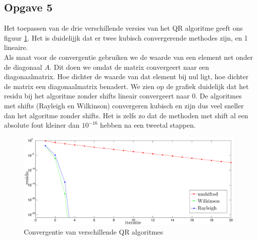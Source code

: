 \documentclass[a4paper, 12pt, titlepage]{report}
\begin{document}
\subsection{Opgave 5}
Het toepassen van de drie verschillende versies van het QR algoritme geeft ons figuur \ref{3QRs}. Het is duidelijjk dat er twee kubisch convergerende methodes zijn, en 1 lineaire. \\
Als maat voor de convergentie gebruiken we de waarde van een element net onder de diagonaal $A$. Dit doen we omdat de matrix convergeert naar een diagonaalmatrix. Hoe dichter de waarde van dat element bij nul ligt, hoe dichter de matrix een diagonaalmatrix benadert. We zien op de grafiek duidelijk dat het residu bij het algoritme zonder shifts lineair convergeert naar 0. De algoritmes met shifts (Rayleigh en Wilkinson) convergeren kubisch en zijn dus veel sneller dan het algoritme zonder shifts. Het is zelfs zo dat de methoden met shift al een absolute fout kleiner dan $10^{-16}$ hebben na een tweetal stappen.\\

\begin{figure}[htb]
	\centering
	\includegraphics[width=\textwidth]{3QRS.eps}
	\caption{Convergentie van verschillende QR algoritmes}
	\label{3QRs}
\end{figure}
\end{document}
